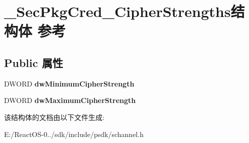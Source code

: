 \hypertarget{struct___sec_pkg_cred___cipher_strengths}{}\section{\+\_\+\+Sec\+Pkg\+Cred\+\_\+\+Cipher\+Strengths结构体 参考}
\label{struct___sec_pkg_cred___cipher_strengths}
\subsection*{Public 属性}
\begin{DoxyCompactItemize}
\item 
\mbox{\label{struct___sec_pkg_cred___cipher_strengths_abc9d4851f5e0074c4764c310b72a6b44}} 
D\+W\+O\+RD {\bfseries dw\+Minimum\+Cipher\+Strength}
\item 
\mbox{\label{struct___sec_pkg_cred___cipher_strengths_a9fe9d60a83510bda669b1fdd88fa8c0f}} 
D\+W\+O\+RD {\bfseries dw\+Maximum\+Cipher\+Strength}
\end{DoxyCompactItemize}


该结构体的文档由以下文件生成\+:\begin{DoxyCompactItemize}
\item 
E\+:/\+React\+O\+S-\/0../sdk/include/psdk/schannel.\+h\end{DoxyCompactItemize}
